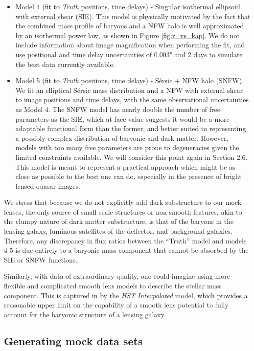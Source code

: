 \begin{itemize}
	\item Model 4 (fit to \textit{Truth} positions, time delays) - Singular isothermal ellipsoid with external shear (SIE). This model is physically motivated by the fact that the combined mass profile of baryons and a NFW halo is well approximated by an isothermal power law, as shown in Figure \ref{fig:r_vs_kap}. We do not include information about image magnification when performing the fit, and use positional and time delay uncertainties of 0.003" and 2 days to simulate the best data currently available.
	\item Model 5 (fit to \textit{Truth} positions, time delays) - S{\'e}rsic + NFW halo (SNFW). We fit an elliptical S{\'e}rsic \cite{Sersic63} mass distribution and a NFW with external shear to image positions and time delays, with the same observational uncertainties as Model 4. The SNFW model has nearly double the number of free parameters as the SIE, which at face value suggests it would be a more adaptable functional form than the former, and better suited to representing a possibly complex distribution of baryonic and dark matter. However, models with too many free parameters are prone to degeneracies given the limited constraints available. We will consider this point again in Section 2.6. This model is meant to represent a practical approach which might be as close as possible to the best one can do, especially in the presence of bright lensed quasar images. 
\end{itemize}

We stress that because we do not explicitly add dark substructure to our mock lenses, the only source of small scale structures or non-smooth features, akin to the clumpy nature of dark matter substructure, is that of the baryons in the lensing galaxy, luminous satellites of the deflector, and background galaxies. Therefore, any discrepancy in flux ratios between the ``Truth'' model and models 4-5 is due entirely to a baryonic mass component that cannot be absorbed by the SIE or SNFW functions.

Similarly, with data of extraordinary quality, one could imagine using more flexible and complicated smooth lens models to describe the stellar mass component. This is captured in by the \textit{HST Interpolated} model, which provides a reasonable upper limit on the capability of a smooth lens potential to fully account for the baryonic structure of a lensing galaxy.

\subsection{Generating mock data sets}
\label{ssec:mocks}

